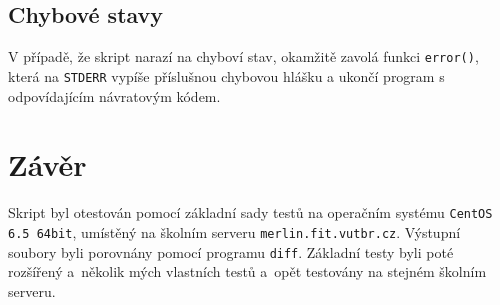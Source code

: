 \documentclass[a4paper, 10pt]{article}
\begin{document}
\subsection{Chybové stavy}
V případě, že skript narazí na chyboví stav, okamžitě zavolá funkci \texttt{error()}, která na \texttt{STDERR} vypíše příslušnou chybovou hlášku a ukončí program s odpovídajícím návratovým kódem.

\section{Závěr}
Skript byl otestován pomocí základní sady testů na operačním systému \texttt{CentOS 6.5 64bit}, umístěný na školním serveru \texttt{merlin.fit.vutbr.cz}. Výstupní soubory byli porovnány pomocí programu \texttt{diff}. Základní testy byli poté rozšířený a~několik mých vlastních testů a~opět testovány na stejném školním serveru. 
                                                                                                                                                                                    
\end{document}
